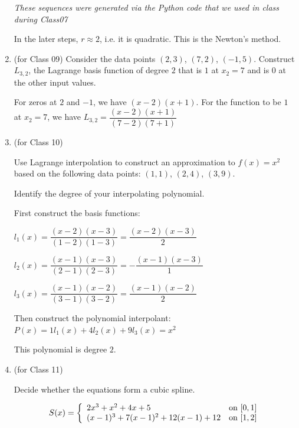 \documentclass[12pt,letterpaper,answers]{exam}
\begin{document}
\begin{enumerate}
\emph{These sequences were generated via the Python code that we used in class during Class07}

\begin{solution}
In the later steps, $r\approx 2$, i.e. it is quadratic.  This is the Newton's method.
\end{solution}

\item (for Class 09)
Consider the data points $(2,3)$, $(7, 2)$, $(-1, 5)$.  Construct $L_{3,2}$, the Lagrange basis function of degree $2$ that is $1$ at $x_2 = 7$ and is $0$ at the other input values.

\begin{solution}
For zeros at $2$ and $-1$, we have $(x-2)(x+1)$.  For the function to be $1$ at $x_2 = 7$, we have $L_{3,2} = \dfrac{(x-2)(x+1)}{(7-2)(7+1)}$

\end{solution}

\item (for Class 10)

Use Lagrange interpolation to construct an approximation to $f(x) = x^2$ based on the following data points: $(1,1)$, $(2,4)$, $(3,9)$.

Identify the degree of your interpolating polynomial.

\begin{solution}
First construct the basis functions:

$l_1(x) = \dfrac{(x-2)(x-3)}{(1-2)(1-3)} = \dfrac{(x-2)(x-3)}{2}$

$l_2(x) = \dfrac{(x-1)(x-3)}{(2-1)(2-3)} = -\dfrac{(x-1)(x-3)}{1}$

$l_3(x) = \dfrac{(x-1)(x-2)}{(3-1)(3-2)} =  \dfrac{(x-1)(x-2)}{2}$

Then construct the polynomial interpolant:
$P(x) = 1l_1(x) + 4l_2(x) + 9l_3(x)=x^2$

This polynomial is degree $2$.

\end{solution}

\item (for Class 11)

Decide whether the equations form a cubic spline.

\[S(x) = \left\{\begin{array}{l l}
2x^3 + x^2 + 4x + 5 & \text{on }[0,1] \\
(x-1)^3 + 7(x-1)^2 + 12(x-1) + 12 & \text{on }[1,2] \\
\end{array}\right.\]


\end{enumerate}
\end{document}
